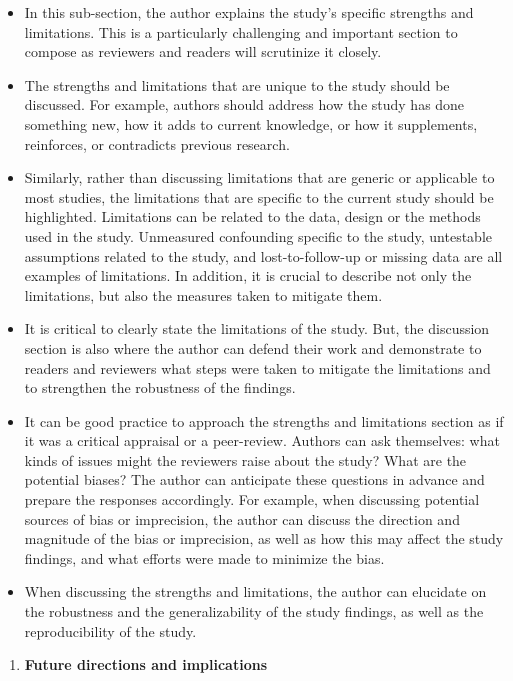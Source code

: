 \documentclass[
]{book}
\providecommand{\tightlist}{%
  \setlength{\itemsep}{0pt}\setlength{\parskip}{0pt}}
\begin{document}
\begin{itemize}
\tightlist
\item
  In this sub-section, the author explains the study's specific strengths and limitations. This is a particularly challenging and important section to compose as reviewers and readers will scrutinize it closely.
\item
  The strengths and limitations that are unique to the study should be discussed. For example, authors should address how the study has done something new, how it adds to current knowledge, or how it supplements, reinforces, or contradicts previous research.
\item
  Similarly, rather than discussing limitations that are generic or applicable to most studies, the limitations that are specific to the current study should be highlighted. Limitations can be related to the data, design or the methods used in the study. Unmeasured confounding specific to the study, untestable assumptions related to the study, and lost-to-follow-up or missing data are all examples of limitations. In addition, it is crucial to describe not only the limitations, but also the measures taken to mitigate them.
\item
  It is critical to clearly state the limitations of the study. But, the discussion section is also where the author can defend their work and demonstrate to readers and reviewers what steps were taken to mitigate the limitations and to strengthen the robustness of the findings.
\item
  It can be good practice to approach the strengths and limitations section as if it was a critical appraisal or a peer-review. Authors can ask themselves: what kinds of issues might the reviewers raise about the study? What are the potential biases? The author can anticipate these questions in advance and prepare the responses accordingly. For example, when discussing potential sources of bias or imprecision, the author can discuss the direction and magnitude of the bias or imprecision, as well as how this may affect the study findings, and what efforts were made to minimize the bias.
\item
  When discussing the strengths and limitations, the author can elucidate on the robustness and the generalizability of the study findings, as well as the reproducibility of the study.
\end{itemize}

\begin{enumerate}
\def\labelenumi{\arabic{enumi}.}
\setcounter{enumi}{4}
\tightlist
\item
  \textbf{Future directions and implications}
\end{enumerate}
\end{document}
